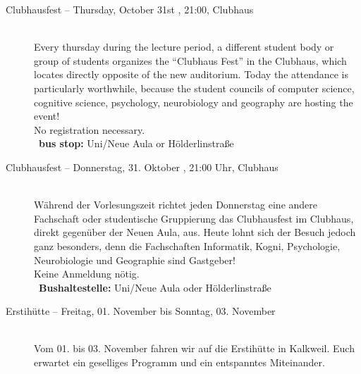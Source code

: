 \begin{description}
\ifml
    \item[Clubhausfest -- Thursday, October 31st \YEAR, 21:00, Clubhaus]\ \\
    Every thursday during the lecture period, a different student body or group of students organizes the "`Clubhaus Fest"' in
    the Clubhaus, which locates directly opposite of the new auditorium. Today the attendance is particularly worthwhile, because
    the student councils of computer science, cognitive science, psychology, neurobiology and geography are hosting the event! \\
    No registration necessary.\\
    ~\textbf{bus stop:} Uni/Neue Aula or Hölderlinstraße
\else
    \item[Clubhausfest -- Donnerstag, 31. Oktober \YEAR, 21:00 Uhr, Clubhaus]\ \\
    Während der Vorlesungszeit richtet jeden Donnerstag eine andere Fachschaft oder studentische Gruppierung das Clubhausfest
    im Clubhaus, direkt gegenüber der Neuen Aula, aus. Heute lohnt sich der Besuch jedoch ganz besonders, denn die Fachschaften
    Informatik, Kogni, Psychologie, Neurobiologie und Geographie sind Gastgeber! \\
    Keine Anmeldung nötig.\\
    ~\textbf{Bushaltestelle:} Uni/Neue Aula oder Hölderlinstraße
\fi

\ifml \pagebreak \fi

\ifml
\else
   \item[Erstihütte -- Freitag, 01. November bis Sonntag, 03. November \YEAR]~\\
   Vom 01. bis 03. November fahren wir auf die Erstihütte in Kalkweil.
   Euch erwartet ein geselliges Programm und ein entspanntes Miteinander.
\fi


\end{description}
